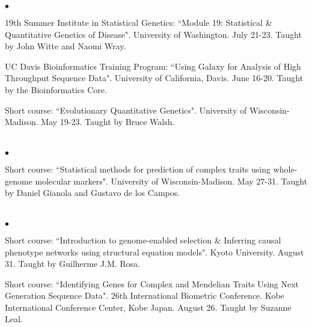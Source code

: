 \documentclass[margin,line,10pt]{res}
\newenvironment{list2}{
  \begin{list}{$\bullet$}{%
      \setlength{\itemsep}{0in}
      \setlength{\parsep}{0in} \setlength{\parskip}{0in}
      \setlength{\topsep}{0in} \setlength{\partopsep}{0in} 
      \setlength{\leftmargin}{0.2in}}}{\end{list}}
\begin{document}
\begin{resume}
\begin{list2}
\item 19th Summer Institute in Statistical Genetics: 
``Module 19: Statistical \& Quantitative Genetics of Disease". University of Washington. July 21-23.
Taught by John Witte and Naomi Wray. 

\vspace{0.5cm}

\item UC Davis Bioinformatics Training Program: 
``Using Galaxy for Analysis of High Throughput Sequence Data". University of California, Davis. June 16-20. 
Taught by the Bioinformatics Core. 

\vspace{0.5cm}

\item Short course: ``Evolutionary Quantitative Genetics". University of Wisconsin-Madison. May 19-23. 
Taught by Bruce Walsh. 

\end{list2}

\section{}
\begin{list2}
\item Short course: ``Statistical methods for prediction of complex traits using whole-genome molecular markers". University of Wisconsin-Madison. May 27-31. 
Taught by Daniel Gianola and Gustavo de los Campos.
\end{list2}  

\section{}
\begin{list2}
\item Short course: ``Introduction to genome-enabled selection \& Inferring causal phenotype networks using structural equation models". 
Kyoto University. August 31. Taught by Guilherme J.M. Rosa. 

\vspace{0.5cm}

\item Short course: ``Identifying Genes for Complex and Mendelian Traits Using Next Generation Sequence Data". 26th International Biometric Conference. Kobe International Conference Center, Kobe Japan. August 26. Taught by Suzanne Leal.  

\vspace{0.5cm}


\end{list2}
\end{resume}
\end{document}
